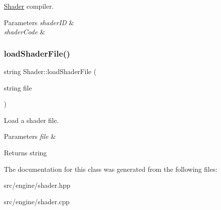 \mbox{\hyperlink{classShader}{Shader}} compiler. 


\begin{DoxyParams}{Parameters}
{\em shader\+ID} & \\
\hline
{\em shader\+Code} & \\
\hline
\end{DoxyParams}
\mbox{\label{classShader_a080150b058525de4f338edb6c6bdd450}} 
\subsubsection{\texorpdfstring{loadShaderFile()}{loadShaderFile()}}
{\footnotesize\ttfamily string Shader\+::load\+Shader\+File (\begin{DoxyParamCaption}\item[{string}]{file }\end{DoxyParamCaption})\hspace{0.3cm}{\ttfamily [protected]}}



Load a shader file. 


\begin{DoxyParams}{Parameters}
{\em file} & \\
\hline
\end{DoxyParams}
\begin{DoxyReturn}{Returns}
string 
\end{DoxyReturn}


The documentation for this class was generated from the following files\+:\begin{DoxyCompactItemize}
\item 
src/engine/shader.\+hpp\item 
src/engine/shader.\+cpp\end{DoxyCompactItemize}
